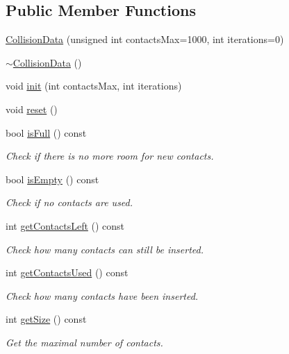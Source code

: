 \subsection*{Public Member Functions}
\begin{DoxyCompactItemize}
\item 
\mbox{\hyperlink{classr3_1_1_collision_data_a439100db9ec5b734e2f0b778d2f97cce}{Collision\+Data}} (unsigned int contacts\+Max=1000, int iterations=0)
\item 
\mbox{\hyperlink{classr3_1_1_collision_data_a3fd93aed7add6b43bc6b3dca59d638f2}{$\sim$\+Collision\+Data}} ()
\item 
void \mbox{\hyperlink{classr3_1_1_collision_data_a2af69fd6da492254b1a134d4ef82efce}{init}} (int contacts\+Max, int iterations)
\item 
void \mbox{\hyperlink{classr3_1_1_collision_data_af74822ca6881f5ab54447a73ac26d7fd}{reset}} ()
\item 
bool \mbox{\hyperlink{classr3_1_1_collision_data_aebb099e77b79235942a9c0166eb66a78}{is\+Full}} () const
\begin{DoxyCompactList}\small\item\em Check if there is no more room for new contacts. \end{DoxyCompactList}\item 
bool \mbox{\hyperlink{classr3_1_1_collision_data_a3b97a4828252625e891c939ad7ce0064}{is\+Empty}} () const
\begin{DoxyCompactList}\small\item\em Check if no contacts are used. \end{DoxyCompactList}\item 
int \mbox{\hyperlink{classr3_1_1_collision_data_a13e8ade4bbbbc63a1437de9371fea879}{get\+Contacts\+Left}} () const
\begin{DoxyCompactList}\small\item\em Check how many contacts can still be inserted. \end{DoxyCompactList}\item 
int \mbox{\hyperlink{classr3_1_1_collision_data_aaf0e65914133cd35cc32224df851561e}{get\+Contacts\+Used}} () const
\begin{DoxyCompactList}\small\item\em Check how many contacts have been inserted. \end{DoxyCompactList}\item 
int \mbox{\hyperlink{classr3_1_1_collision_data_ad0898e21e34b4558dbdd68dd115c49d8}{get\+Size}} () const
\begin{DoxyCompactList}\small\item\em Get the maximal number of contacts. \end{DoxyCompactList}\item 

\end{DoxyCompactItemize}
